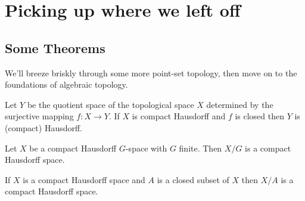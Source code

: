 \documentclass{fkbook}
\begin{document}
\section{Picking up where we left off}
\begin{adjustwidth}{1em}{1em}
  \subsection{Some Theorems}
  We'll breeze briskly through some more point-set topology, then move
  on to the foundations of algebraic topology.
  \begin{theorem}
    Let $Y$ be the quotient space of the topological space $X$
    determined by the surjective mapping $f : X \to Y$. If $X$ is
    compact Hausdorff and $f$ is closed then $Y$ is (compact)
    Hausdorff.
  \end{theorem}
  \begin{corollary}
    Let $X$ be a compact Hausdorff $G$-space with $G$ finite. Then
    $X/G$ is a compact Hausdorff space.
  \end{corollary}
  \begin{corollary}
    If $X$ is a compact Hausdorff space and $A$ is a closed subset of
    $X$ then $X/A$ is a compact Hausdorff space.
  \end{corollary}
  \end{adjustwidth}
\end{document}

